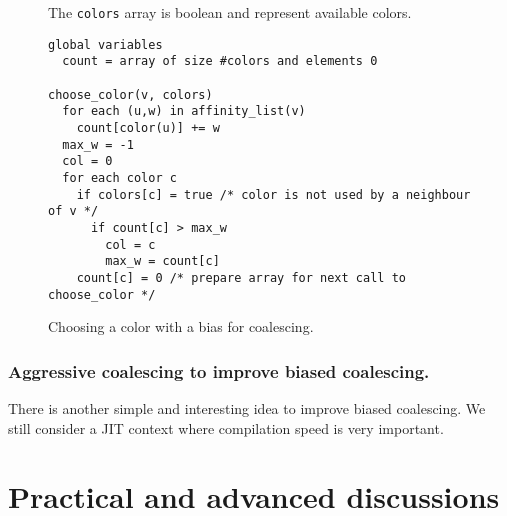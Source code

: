 {\begin{figure}
  The {\tt colors} array is boolean and represent available colors.

  \begin{verbatim}
global variables
  count = array of size #colors and elements 0

choose_color(v, colors)
  for each (u,w) in affinity_list(v)
    count[color(u)] += w
  max_w = -1
  col = 0
  for each color c
    if colors[c] = true /* color is not used by a neighbour of v */
      if count[c] > max_w
        col = c
        max_w = count[c]
    count[c] = 0 /* prepare array for next call to choose_color */
  \end{verbatim}
  \caption{Choosing a color with a bias for coalescing.}
  \label{code:choose-color}
\end{figure}


\subsubsection{Aggressive coalescing to improve biased coalescing.}

There is another simple and interesting idea to improve biased coalescing. We 
still consider a JIT context where compilation speed is very important.






\section{Practical and advanced discussions}
\label{sec:practical-regalloc}

}
